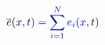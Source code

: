 \documentclass[12pt]{article}
\begin{document}
\makeatletter
\renewcommand*{\@textcolor}[3]{%
  \protect\leavevmode
  \begingroup
    \color#1{#2}#3%
  \endgroup
}
\makeatother
\begin{displaymath}
\mathcolor[RGB]{0,0,15}{\overline { { \mathcolor[RGB]{0,0,30}{e} } } } \mathcolor[RGB]{0,0,45}{(} \mathcolor[RGB]{0,0,60}{x} \mathcolor[RGB]{0,0,75}{,} \mathcolor[RGB]{0,0,90}{t} \mathcolor[RGB]{0,0,105}{)} \mathcolor[RGB]{0,0,120}{=} \mathcolor[RGB]{0,0,135}{\sum} _ { \mathcolor[RGB]{0,0,150}{i} \mathcolor[RGB]{0,0,165}{=} \mathcolor[RGB]{0,0,180}{1} } ^ { \mathcolor[RGB]{0,0,195}{N} } \mathcolor[RGB]{0,0,210}{e} _ { \mathcolor[RGB]{0,0,225}{i} } \mathcolor[RGB]{0,0,240}{(} \mathcolor[RGB]{0,0,255}{x} \mathcolor[RGB]{0,15,0}{,} \mathcolor[RGB]{0,15,15}{t} \mathcolor[RGB]{0,15,30}{)}
\end{displaymath}
\end{document}
